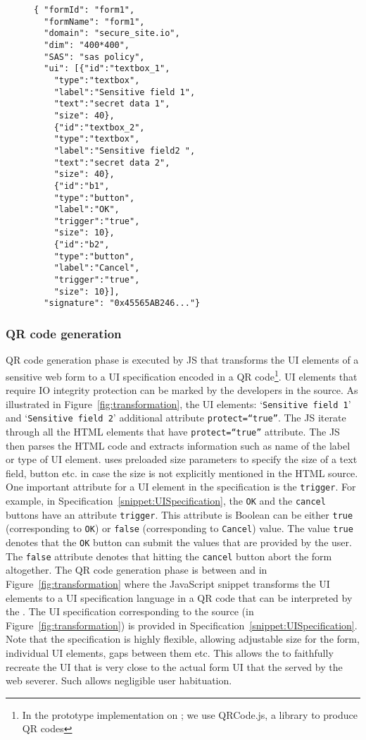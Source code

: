 \begin{figure}[t]
\begin{lstlisting}[mathescape=true]
{ "formId": "form1",
  "formName": "form1",
  "domain": "secure_site.io",
  "dim": "400*400",
  "SAS": "sas policy",
  "ui": [{"id":"textbox_1",
  	"type":"textbox",
	"label":"Sensitive field 1",
	"text":"secret data 1",
	"size": 40},
	{"id":"textbox_2",
	"type":"textbox",
	"label":"Sensitive field2 ",
	"text":"secret data 2",
	"size": 40},
	{"id":"b1",
	"type":"button",
	"label":"OK",
	"trigger":"true",
	"size": 10},	
	{"id":"b2",
	"type":"button",
	"label":"Cancel",
	"trigger":"true",
	"size": 10}],
  "signature": "0x45565AB246..."}
\end{lstlisting}
\end{figure}

\subsubsection{QR code generation}
\label{sec:prototype:impl:qr}

QR code generation phase is executed by \name JS that transforms the UI elements of a sensitive web form to a UI specification encoded in a QR code\footnote{In the prototype implementation on \name; we use QRCode.js, a \js library to produce QR codes}. UI elements that require IO integrity protection can be marked by the developers in the \html source. As illustrated in Figure~\ref{fig:transformation}, the \html UI elements: `\texttt{Sensitive field 1}' and `\texttt{Sensitive field 2}' additional attribute \texttt{protect=``true''}. The \name JS iterate through all the HTML elements that have \texttt{protect=``true''} attribute. The JS then parses the HTML code and extracts information such as name of the label or type of UI element. \device uses preloaded size parameters to specify the size of a text field, button etc. in case the size is not explicitly mentioned in the HTML source. One important attribute for a UI element in the specification is the \texttt{trigger}. For example, in Specification~\ref{snippet:UISpecification}, the \texttt{OK} and the \texttt{cancel} buttons have an attribute \texttt{trigger}. This attribute is Boolean can be either \texttt{true} (corresponding to \texttt{OK}) or \texttt{false} (corresponding to \texttt{Cancel}) value. The value \texttt{true} denotes that the \texttt{OK} button can submit the values that are provided by the user. The \texttt{false} attribute denotes that hitting the \texttt{cancel} button abort the form altogether.
The QR code generation phase is between \one and \two in Figure~\ref{fig:transformation} where the \name JavaScript snippet transforms the UI elements to a UI specification language in a QR code that can be interpreted by the \device. The UI specification corresponding to the \html source (in Figure~\ref{fig:transformation}) is provided in Specification~\ref{snippet:UISpecification}. Note that the specification is highly flexible, allowing adjustable size for the form, individual UI elements, gaps between them etc. This allows the \device to faithfully recreate the UI that is very close to the actual form UI that the served by the web severer. Such allows negligible user habituation. 



